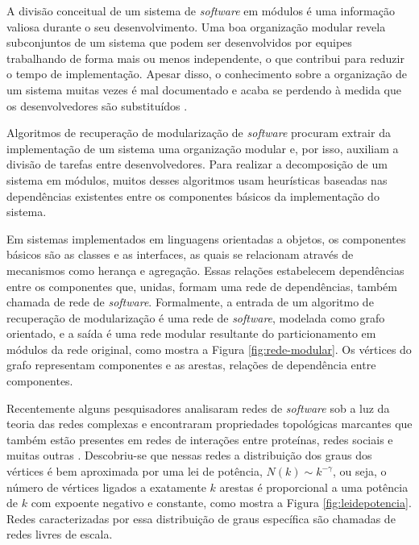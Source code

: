 \documentclass[12pt]{article}
\begin{document}
A divisão conceitual de um sistema de \emph{software} em módulos é uma
informação valiosa durante o seu desenvolvimento. Uma boa organização modular
revela subconjuntos de um sistema que podem ser desenvolvidos por equipes
trabalhando de forma mais ou menos independente, o que contribui para reduzir o
tempo de implementação. Apesar disso, o conhecimento sobre a organização de um
sistema muitas vezes é mal documentado e acaba se perdendo à medida que os
desenvolvedores são substituídos \cite{Clements2002}. %

Algoritmos de recuperação de modularização de \emph{software} procuram extrair
da implementação de um sistema uma organização modular e, por isso, auxiliam a
divisão de tarefas entre desenvolvedores.  Para realizar a decomposição de um
sistema em módulos, muitos desses algoritmos usam heurísticas baseadas nas
dependências existentes entre os componentes básicos da implementação do
sistema.

Em sistemas implementados em linguagens orientadas a objetos, os componentes
básicos são as classes e as interfaces, as quais se relacionam através de
mecanismos como herança e agregação. Essas relações estabelecem dependências
entre os componentes que, unidas, formam uma rede de dependências, também
chamada de rede de \emph{software}. Formalmente, a entrada de um algoritmo de
recuperação de modularização é uma rede de \emph{software}, modelada como
grafo orientado, e a saída é uma rede modular resultante do particionamento em
módulos da rede original, como mostra a Figura \ref{fig:rede-modular}. Os
vértices do grafo representam componentes e as arestas, relações de dependência
entre componentes.


Recentemente alguns pesquisadores analisaram redes de \emph{software} sob a luz
da teoria das redes complexas e encontraram propriedades topológicas marcantes
que também estão presentes em redes de interações entre proteínas, redes
sociais e muitas outras \cite{Myers2003,Valverde2003}. Descobriu-se que nessas
redes a distribuição dos graus dos vértices é bem aproximada por uma lei de
potência, $N(k) \sim k^{-\gamma}$, ou seja, o número de vértices ligados a
exatamente $k$ arestas é proporcional a uma potência de $k$ com expoente
negativo e constante, como mostra a Figura \ref{fig:leidepotencia}. Redes
caracterizadas por essa distribuição de graus específica são chamadas de redes
livres de escala. %


\end{document}
